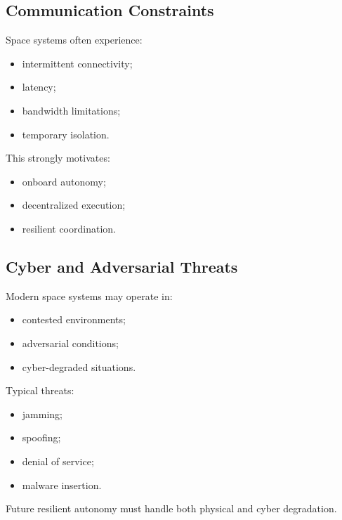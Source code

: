 \documentclass[10pt,a4paper,twocolumn]{article}
\begin{document}
\subsection{Communication Constraints}

Space systems often experience:
\begin{itemize}
    \item intermittent connectivity;
    \item latency;
    \item bandwidth limitations;
    \item temporary isolation.
\end{itemize}

This strongly motivates:
\begin{itemize}
    \item onboard autonomy;
    \item decentralized execution;
    \item resilient coordination.
\end{itemize}


\subsection{Cyber and Adversarial Threats}

Modern space systems may operate in:
\begin{itemize}
    \item contested environments;
    \item adversarial conditions;
    \item cyber-degraded situations.
\end{itemize}

Typical threats:
\begin{itemize}
    \item jamming;
    \item spoofing;
    \item denial of service;
    \item malware insertion.
\end{itemize}

\begin{keybox}
    Future resilient autonomy must handle both physical and cyber degradation.
\end{keybox}

\end{document}
